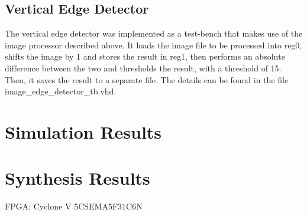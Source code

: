 \documentclass[a4paper, 10pt, titlepage]{article}
\begin{document}
\subsection{Vertical Edge Detector}

The vertical edge detector was implemented as a test-bench that makes use of the image processor described above. It loads the image file to be processed into reg0, shifts the image by 1 and stores the result in reg1, then performs an absolute difference between the two and thresholds the result, with a threshold of 15. Then, it saves the result to a separate file. The details can be found in the file image\_edge\_detector\_tb.vhd.

\section{Simulation Results}


\section{Synthesis Results}

FPGA: Cyclone V 5CSEMA5F31C6N
\end{document}
